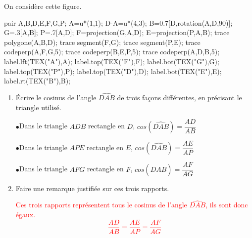 \begin{corrige}
    On considère cette figure.

    \begin{center}
        \begin{Geometrie}
            pair A,B,D,E,F,G,P;
            A=u*(1,1);
            D-A=u*(4,3);
            B=0.7[D,rotation(A,D,90)];            
            G=.3[A,B];
            P=.7[A,D];
            F=projection(G,A,D);
            E=projection(P,A,B);
            trace polygone(A,B,D);
            trace segment(F,G);
            trace segment(P,E);
            trace codeperp(A,F,G,5);
            trace codeperp(B,E,P,5);
            trace codeperp(A,D,B,5);
            label.lft(TEX("A"),A);
            label.top(TEX("F"),F);
            label.bot(TEX("G"),G);
            label.top(TEX("P"),P);
            label.top(TEX("D"),D);
            label.bot(TEX("E"),E);
            label.rt(TEX("B"),B);
        \end{Geometrie}
    \end{center}
    \begin{enumerate}
        \item Écrire le cosinus de l'angle $\widehat{DAB}$ de trois façons différentes, en précisant le triangle utilisé.
        
        {\color{red}
        \begin{itemize}
            \def\item{$\bullet$}
            \item Dans le triangle $ADB$ rectangle en $D$, $cos(\widehat{DAB})=\dfrac{AD}{AB}$
            
            \item Dans le triangle $APE$ rectangle en $E$, $cos(\widehat{DAB})=\dfrac{AE}{AP}$
            
            \item Dans le triangle $AFG$ rectangle en $F$, $cos(\widehat{DAB})=\dfrac{AF}{AG}$
        \end{itemize}
        }
        \item Faire une remarque justifiée sur ces trois rapports.
        
        \textcolor{red}{Ces trois rapports représentent tous le cosinus de l'angle $\widehat{DAB}$, ils sont donc égaux. $$\dfrac{AD}{AB}=\dfrac{AE}{AP}=\dfrac{AF}{AG}$$}
    \end{enumerate}
\end{corrige}

